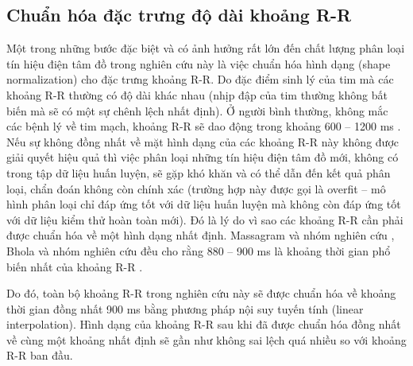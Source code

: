 \subsection{Chuẩn hóa đặc trưng độ dài khoảng R-R}
Một trong những bước đặc biệt và có ảnh hưởng rất lớn đến chất lượng phân loại tín hiệu điện tâm đồ trong nghiên cứu này là việc chuẩn hóa hình dạng (shape normalization) cho đặc trưng khoảng R-R. Do đặc điểm sinh lý của tim mà các khoảng R-R thường có độ dài khác nhau (nhịp đập của tim thường không bất biến mà sẽ có một sự chênh lệch nhất định). Ở người bình thường, không mắc các bệnh lý về tim mạch, khoảng R-R sẽ dao động trong khoảng 600 – 1200 ms \cite{64} . Nếu sự không đồng nhất về mặt hình dạng của các khoảng R-R này không được giải quyết hiệu quả thì việc phân loại những tín hiệu điện tâm đồ mới, không có trong tập dữ liệu huấn luyện, sẽ gặp khó khăn và có thể dẫn đến kết quả phân loại, chẩn đoán không còn chính xác (trường hợp này được gọi là overfit – mô hình phân loại chỉ đáp ứng tốt với dữ liệu huấn luyện mà không còn đáp ứng tốt với dữ liệu kiểm thử hoàn toàn mới). Đó là lý do vì sao các khoảng R-R cần phải được chuẩn hóa về một hình dạng nhất định. Massagram và nhóm nghiên cứu \cite{67}, Bhola và nhóm nghiên cứu đều cho rằng 880 – 900 ms là khoảng thời gian phổ biến nhất của khoảng R-R \cite{68}.

Do đó, toàn bộ khoảng R-R trong nghiên cứu này sẽ được chuẩn hóa về khoảng thời gian đồng nhất 900 ms bằng phương pháp nội suy tuyến tính (linear interpolation). Hình dạng của khoảng R-R sau khi đã được chuẩn hóa đồng nhất về cùng một khoảng nhất định sẽ gần như không sai lệch quá nhiều so với khoảng R-R ban đầu.


